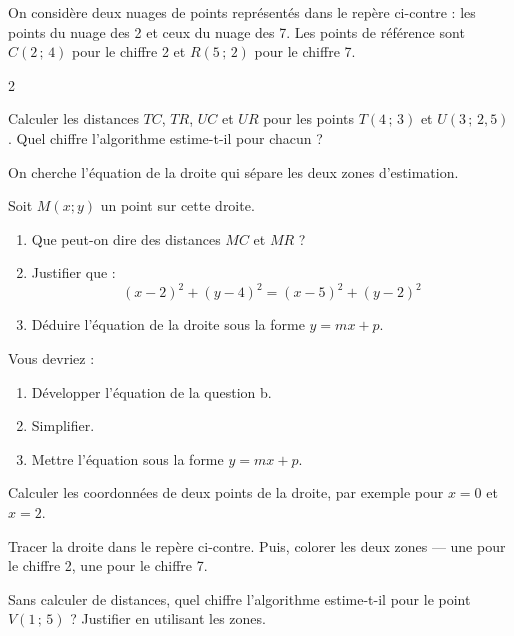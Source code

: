 On considère deux nuages de points représentés dans le repère ci-contre : les points du nuage des 2 et ceux du nuage des 7. Les points de référence sont $C(2\,;\,4)$ pour le chiffre 2 et $R(5\,;\,2)$ pour le chiffre 7.

		\begin{multicols}{2}

			\begin{MADenumerate}

				\item Calculer les distances $TC$, $TR$, $UC$ et $UR$ pour les points $T(4\,;\,3)$ et $U(3\,;\,2{,}5)$. Quel chiffre l'algorithme estime-t-il pour chacun ?

				\item On cherche l'équation de la droite qui sépare les deux zones d'estimation.

				Soit $M(x;y)$ un point sur cette droite.
				\begin{enumerate}
					\item Que peut-on dire des distances $MC$ et $MR$ ?
					\item Justifier que :
					      $$(x-2)^2+(y-4)^2=(x-5)^2+(y-2)^2$$
					\item Déduire l'équation de la droite sous la forme $y=mx+p$.
				\end{enumerate}

				\begin{exemple}[Aide]
					Vous devriez :
					\begin{enumerate}
						\item Développer l'équation de la question b.
						\item Simplifier.
						\item Mettre l'équation sous la forme $y=mx+p$.
					\end{enumerate}
				\end{exemple}

				\item Calculer les coordonnées de deux points de la droite, par exemple pour $x=0$ et $x=2$.

				\item Tracer la droite dans le repère ci-contre. Puis, colorer les deux zones — une pour le chiffre 2, une pour le chiffre 7.

				\item Sans calculer de distances, quel chiffre l'algorithme estime-t-il pour le point $V(1\,;\,5)$ ? Justifier en utilisant les zones.

			\end{MADenumerate}


\end{multicols}
